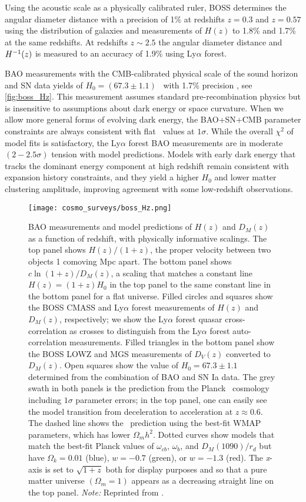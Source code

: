 Using the acoustic scale as a physically calibrated ruler, BOSS determines the angular diameter distance with a precision of 1\% at redshifts $z = 0.3$ and $z = 0.57$ using the distribution of galaxies and measurements of $H(z)$ to 1.8\% and 1.7\%  at the same redshifts. At redshifts $z\sim2.5$ the  angular diameter distance and $H^{-1}(z)$ is measured to an accuracy of 1.9\% using Ly$\alpha$ forest.

BAO measurements with the CMB-calibrated physical scale of the sound horizon and SN data yields of $H_0=(67.3\pm1.1)$ \unith\ with 1.7\% precision \cite{BOSS_results}, see \autoref{fig:boss_Hz}. This measurement assumes standard pre-recombination physics but is insensitive to assumptions about dark energy or space curvature. When we allow more general forms of evolving dark energy, the BAO+SN+CMB parameter constraints are always consistent with flat \LCDM\ values at $1\sigma$. While the overall $\chi^2$ of model fits is satisfactory, the Ly$\alpha$ forest BAO measurements are in moderate $(2-2.5\sigma)$ tension with model predictions. Models with early dark energy that tracks the dominant energy component at high redshift remain consistent with expansion history constraints, and they yield a higher $H_0$ and lower matter clustering amplitude, improving agreement with some low-redshift observations.
\begin{figure}[htbp]
    \centering
    \texttt{[image: cosmo\_surveys/boss\_Hz.png]}
    \caption{BAO measurements and model predictions of \(H(z)\) and \(D_M(z)\) as a function of redshift, with physically informative scalings. The top panel shows \(H(z)/(1+z)\), the proper velocity between two objects 1 comoving Mpc apart. The bottom panel shows \(c\ln{(1+z)}/D_M(z)\), a scaling that matches a constant line \(H(z)=(1+z)H_0\) in the top panel to the same constant line in the bottom panel for a flat universe. Filled circles and squares show the BOSS CMASS and Ly$\alpha$ forest measurements of \(H(z)\) and \(D_M(z)\), respectively; we show the Ly$\alpha$ forest quasar cross-correlation as crosses to distinguish from the Ly$\alpha$ forest auto-correlation measurements. Filled triangles in the bottom panel show the BOSS LOWZ and MGS measurements of \(D_V (z)\) converted to \(D_M(z)\). Open squares show the value of \(H_0 = 67.3\pm1.1\) \unith determined from the combination of BAO and SN Ia data. The grey swath in both panels is the prediction from the Planck \LCDM\ cosmology including \(1\sigma\) parameter errors; in the top panel, one can easily see the model transition from deceleration to acceleration at \(z\approx0.6\). The dashed line shows the \LCDM\ prediction using the best-fit WMAP parameters, which has lower \(\Omega_mh^2\). Dotted curves show models that match the best-fit Planck values of \(\omega_{cb}\), \(\omega_{b}\), and \(D_M(1090)/r_d\) but have \(\Omega_k = 0.01\) (blue), \(w = -0.7\) (green), or \(w = -1.3\) (red). The \textit{x}-axis is set to \(\sqrt{1+z}\) both for display purposes and so that a pure matter universe \((\Omega_m = 1)\) appears as a decreasing straight line on the top panel. \textit{Note:} Reprinted from \textcite{BOSS_results}.}
    \label{fig:boss_Hz}
\end{figure}
